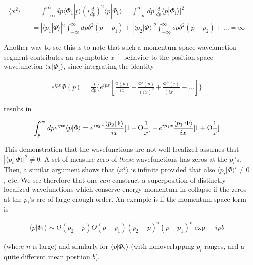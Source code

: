 \documentclass[12pt]{article}
\begin{document}
\begin{eqnarray*}
\langle x^{2}\rangle \!\!\!\!\!\!\!\!\!\!&&=\int_{-\infty}^ {\infty}dp\langle\Phi_{1}|p\rangle 
(i\frac{d}{dp})^{2}\langle p|\Phi_{1}\rangle =
\int_{-\infty}^ {\infty}dp|\frac {d}{dp}\langle p|\Phi_{1}\rangle|^{2}\\
&&=|\langle p_{1}|\Phi\rangle|^{2}\int_{-\infty}^ {\infty}dp\delta^{2}(p-p_{1})+
|\langle p_{2}|\Phi\rangle|^{2}\int_{-\infty}^ {\infty}dp\delta^{2}(p-p_{2})+...=\infty
\end{eqnarray*}
  
	Another way to see this is to note that such a momentum space wavefunction segment 
contributes an asymptotic $x^{-1}$ behavior to the position space wavefunction $\langle x|\Phi_{1}\rangle$,  
since integrating the identity

\begin{eqnarray*}
e^{ipx}\Phi (p)=\frac{d}{dp}\{e^{ipx}[\frac{\Phi (p)}{ix}-\frac{\Phi '(p)}{(ix)^{2}}+
\frac{\Phi ''(p)}{(ix)^{3}}-...]\}
\end{eqnarray*} 

\noindent results in 

\begin{eqnarray}\label{2}
\int_{p_{1}}^{p_{2}}dpe^{ipx}\langle p|\Phi\rangle=
e^{ip_{2}x}\frac{\langle p_{2}|\Phi\rangle}{ix}[1+\hbox{O}\frac{1}{x}]-
e^{ip_{1}x}\frac{\langle p_{1}|\Phi\rangle}{ix}[1+\hbox{O}\frac{1}{x}]
\end{eqnarray}

	 This demonstration that the wavefunctions are not well localized 
assumes that $|\langle p_{i}|\Phi\rangle|^{2}\neq 0$. A set of measure zero 
of {\it these} wavefunctions 
has zeros at the $p_{i}$'s.  Then, a similar argument shows that $\langle x^{4}\rangle$ 
is infinite provided that also $\langle p_{i}|\Phi\rangle '\neq 0$, etc. We see 
therefore that one {\it can} construct 
a superposition of distinctly localized wavefunctions which conserve energy-momentum 
in collapse if the zeros at the $p_{i}$'s are of large enough order. An example is if the momentum space form is 

\begin{eqnarray*}
\langle p|\Phi_{1}\rangle\sim\Theta (p_{2}-p)\Theta (p-p_{1})(p_{2}-p)^{n}(p-p_{1})^{n}\exp -ipb 
\end{eqnarray*}

\noindent (where $n$ is large) and similarly for $\langle p|\Phi_{2}\rangle$ (with nonoverlapping $p_{i}$ 
ranges, and a quite different mean position $b$).
\end{document}

